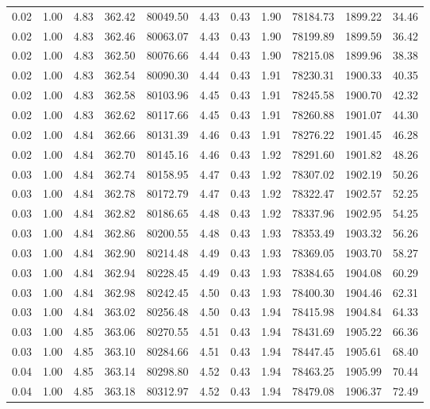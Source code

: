 \begin{table}[!ht]
\begin{tabular}{rrrrrrrrrrr}
0.02 & 1.00 & 4.83 & 362.42 & 80049.50 & 4.43 & 0.43 & 1.90 & 78184.73 & 1899.22 & 34.46 \\
0.02 & 1.00 & 4.83 & 362.46 & 80063.07 & 4.43 & 0.43 & 1.90 & 78199.89 & 1899.59 & 36.42 \\
0.02 & 1.00 & 4.83 & 362.50 & 80076.66 & 4.44 & 0.43 & 1.90 & 78215.08 & 1899.96 & 38.38 \\
0.02 & 1.00 & 4.83 & 362.54 & 80090.30 & 4.44 & 0.43 & 1.91 & 78230.31 & 1900.33 & 40.35 \\
0.02 & 1.00 & 4.83 & 362.58 & 80103.96 & 4.45 & 0.43 & 1.91 & 78245.58 & 1900.70 & 42.32 \\
0.02 & 1.00 & 4.83 & 362.62 & 80117.66 & 4.45 & 0.43 & 1.91 & 78260.88 & 1901.07 & 44.30 \\
0.02 & 1.00 & 4.84 & 362.66 & 80131.39 & 4.46 & 0.43 & 1.91 & 78276.22 & 1901.45 & 46.28 \\
0.02 & 1.00 & 4.84 & 362.70 & 80145.16 & 4.46 & 0.43 & 1.92 & 78291.60 & 1901.82 & 48.26 \\
0.03 & 1.00 & 4.84 & 362.74 & 80158.95 & 4.47 & 0.43 & 1.92 & 78307.02 & 1902.19 & 50.26 \\
0.03 & 1.00 & 4.84 & 362.78 & 80172.79 & 4.47 & 0.43 & 1.92 & 78322.47 & 1902.57 & 52.25 \\
0.03 & 1.00 & 4.84 & 362.82 & 80186.65 & 4.48 & 0.43 & 1.92 & 78337.96 & 1902.95 & 54.25 \\
0.03 & 1.00 & 4.84 & 362.86 & 80200.55 & 4.48 & 0.43 & 1.93 & 78353.49 & 1903.32 & 56.26 \\
0.03 & 1.00 & 4.84 & 362.90 & 80214.48 & 4.49 & 0.43 & 1.93 & 78369.05 & 1903.70 & 58.27 \\
0.03 & 1.00 & 4.84 & 362.94 & 80228.45 & 4.49 & 0.43 & 1.93 & 78384.65 & 1904.08 & 60.29 \\
0.03 & 1.00 & 4.84 & 362.98 & 80242.45 & 4.50 & 0.43 & 1.93 & 78400.30 & 1904.46 & 62.31 \\
0.03 & 1.00 & 4.84 & 363.02 & 80256.48 & 4.50 & 0.43 & 1.94 & 78415.98 & 1904.84 & 64.33 \\
0.03 & 1.00 & 4.85 & 363.06 & 80270.55 & 4.51 & 0.43 & 1.94 & 78431.69 & 1905.22 & 66.36 \\
0.03 & 1.00 & 4.85 & 363.10 & 80284.66 & 4.51 & 0.43 & 1.94 & 78447.45 & 1905.61 & 68.40 \\
0.04 & 1.00 & 4.85 & 363.14 & 80298.80 & 4.52 & 0.43 & 1.94 & 78463.25 & 1905.99 & 70.44 \\
0.04 & 1.00 & 4.85 & 363.18 & 80312.97 & 4.52 & 0.43 & 1.94 & 78479.08 & 1906.37 & 72.49 \\

\end{tabular}
\end{table}
